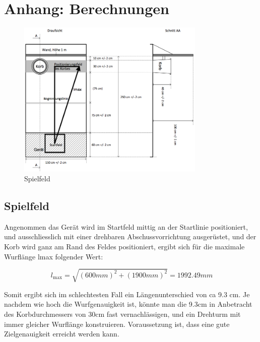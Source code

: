 \section{Anhang: Berechnungen}
\begin{figure}[h!]          
	\centering             
	\includegraphics[width=0.8\textwidth]{fig/Bild_Spielfeld.png}    
	\caption{Spielfeld}
	
	\label{fig:bild}        %
\end{figure}
\noindent
\subsection{Spielfeld}
Angenommen das Gerät wird im Startfeld mittig an der Startlinie positioniert, und ausschliesslich mit einer drehbaren Abschussvorrichtung ausgerüstet, und der Korb wird ganz am Rand des Feldes positioniert, ergibt sich für die maximale Wurflänge lmax folgender Wert: 
 
\[\ l_\text{max} = \sqrt{(600mm)^2 + (1900mm)^2} = 1992.49mm \]

Somit ergibt sich im schlechtesten Fall ein Längenunterschied von ca 9.3 cm. Je nachdem wie hoch die Wurfgenauigkeit ist, könnte man die 9.3cm in Anbetracht des Korbdurchmessers von 30cm fast vernachlässigen, und ein Drehturm mit immer gleicher Wurflänge konstruieren. Voraussetzung ist, dass eine gute Zielgenauigkeit erreicht werden kann.

